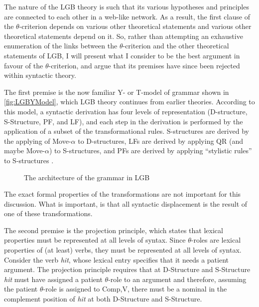 \documentclass[MilwayThesis]{subfiles}
\begin{document}
The nature of the LGB theory is such that its various hypotheses and principles are connected to each other in a web-like network.
As a result, the first clause of the $\theta$-criterion depends on various other theoretical statements and various other theoretical statements depend on it.
So, rather than attempting an exhaustive enumeration of the links between the $\theta$-criterion and the other theoretical statements of LGB, I will present what I consider to be the best argument in favour of the $\theta$-criterion, and argue that its premises have since been rejected within syntactic theory.

The first premise is the now familiar Y- or T-model of grammar shown in \autoref{fig:LGBYModel}, which LGB theory continues from earlier theories.
According to this model, a syntactic derivation has four levels of representation (D-structure, S-Structure, PF, and LF), and each step in the derivation is performed by the application of a subset of the transformational rules.
S-structures are derived by the applying of Move-$\alpha$ to D-structures, LFs are derived by applying QR (and maybe Move-$\alpha$) to S-structures, and PFs are derived by applying ``stylistic rules'' to S-structures \parencite[18]{chomsky1981lectures}.
\begin{figure}[h]
	\centering
{}
	\caption{The architecture of the grammar in LGB}
	\label{fig:LGBYModel}
\end{figure}
The exact formal properties of the transformations are not important for this discussion.
What is important, is that all syntactic displacement is the result of one of these transformations.

The second premise is the projection principle, which states that lexical properties must be represented at all levels of syntax.
Since $\theta$-roles are lexical properties of (at least) verbs, they must be represented at all levels of syntax.
Consider the verb \textit{hit}, whose lexical entry specifies that it needs a patient argument.
The projection principle requires that at D-Structure and S-Structure \textit{hit} must have assigned a patient $\theta$-role to an argument and therefore, assuming the patient $\theta$-role is assigned to Comp,V, there must be a nominal in the complement position of \textit{hit} at both D-Structure and S-Structure.
\end{document}
